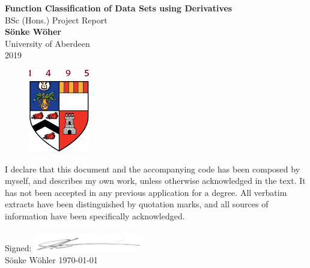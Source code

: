 \documentclass[main.tex]{subfiles}
\begin{document}
  \begin{titlepage}
  \begin{center}
    \vspace*{2.0cm}
    
    \huge
    \textbf{Function Classification of Data Sets using Derivatives} \\
    \LARGE
    BSc (Hons.) Project Report    \\
    \vspace{1.5cm}
    \Large
    \textbf{S\"onke W\"oher}\\
    \large
    University of Aberdeen     \\
    \vspace{1.5cm}
    2019
    
    
    \begin{figure}[h!]
      \centering
      \includegraphics{otherImages/abdnshield}
      \caption*{}
    \end{figure}
    
    \vfill
  \end{center}
  I declare that this document and the accompanying code has been composed by myself, and describes my own work, unless otherwise acknowledged in the text. It has not been accepted in any previous application for a degree. All verbatim extracts have been distinguished by quotation marks, and all sources of information have been specifically acknowledged.
  \\\\
  Signed: 
  \hfill \includegraphics[height=0.78cm]{otherImages/sonkiSignature}\hspace{2.5cm}
  \\
  S\"onke W\"ohler \hfil \today
\end{titlepage} 
\end{document}
